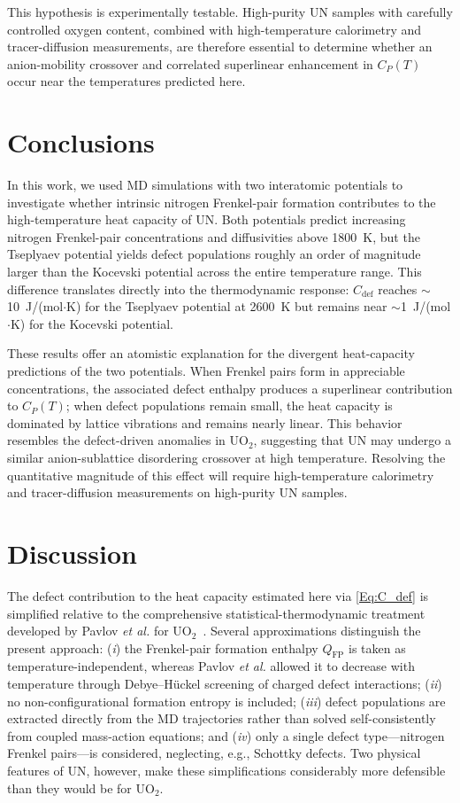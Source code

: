 \documentclass[preprint,12pt,sort&compress]{elsarticle}
\newcommand{\?}{\stackrel{?}{=}}
\begin{document}
This hypothesis is experimentally testable. High-purity UN samples with carefully controlled oxygen content, combined with high-temperature calorimetry and tracer-diffusion measurements, are therefore essential to determine whether an anion-mobility crossover and correlated superlinear enhancement in $C_P(T)$ occur near the temperatures predicted here.

\section{Conclusions}

In this work, we used MD simulations with two interatomic potentials to investigate whether intrinsic nitrogen Frenkel-pair formation contributes to the high-temperature heat capacity of UN. Both potentials predict increasing nitrogen Frenkel-pair concentrations and diffusivities above 1800~K, but the Tseplyaev potential yields defect populations roughly an order of magnitude larger than the Kocevski potential across the entire temperature range. This difference translates directly into the thermodynamic response: $C_\text{def}$ reaches $\sim$10~J/(mol$\cdot$K) for the Tseplyaev potential at 2600~K but remains near $\sim$1~J/(mol$\cdot$K) for the Kocevski potential.

These results offer an atomistic explanation for the divergent heat-capacity predictions of the two potentials. When Frenkel pairs form in appreciable concentrations, the associated defect enthalpy produces a superlinear contribution to $C_P(T)$; when defect populations remain small, the heat capacity is dominated by lattice vibrations and remains nearly linear. This behavior resembles the defect-driven anomalies in UO$_2$, suggesting that UN may undergo a similar anion-sublattice disordering crossover at high temperature. Resolving the quantitative magnitude of this effect will require high-temperature calorimetry and tracer-diffusion measurements on high-purity UN samples.

\section{Discussion}

The defect contribution to the heat capacity estimated here via \cref{Eq:C_def} is simplified relative to the comprehensive statistical-thermodynamic treatment developed by Pavlov \textit{et al.} for UO$_2$~\cite{Pavlov2017}. Several approximations distinguish the present approach: (\textit{i}) the Frenkel-pair formation enthalpy $Q_\text{FP}$ is taken as temperature-independent, whereas Pavlov \textit{et al.} allowed it to decrease with temperature through Debye--H\"{u}ckel screening of charged defect interactions; (\textit{ii}) no non-configurational formation entropy is included; (\textit{iii}) defect populations are extracted directly from the MD trajectories rather than solved self-consistently from coupled mass-action equations; and (\textit{iv}) only a single defect type---nitrogen Frenkel pairs---is considered, neglecting, e.g., Schottky defects. Two physical features of UN, however, make these simplifications considerably more defensible than they would be for UO$_2$.
\end{document}
